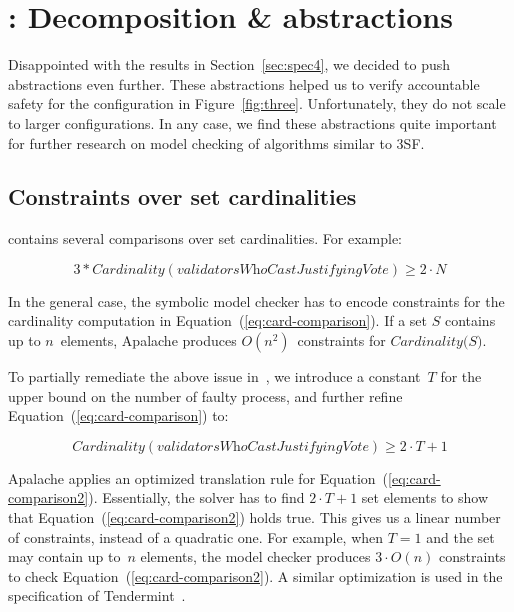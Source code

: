 
\section{\SpecFourB{}: Decomposition \& abstractions}\label{sec:spec4b}

Disappointed with the results in Section~\ref{sec:spec4}, we decided to
push abstractions even further. These abstractions helped us to verify
accountable safety for the configuration in Figure~\ref{fig:three}.
Unfortunately, they do not scale to larger configurations. In any case, we
find these abstractions quite important for further research on model checking
of algorithms similar to 3SF\@.


\subsection{Constraints over set cardinalities}

\SpecThree{} contains several comparisons over set cardinalities. For example:

\begin{equation}
    3 * \textit{Cardinality}(\textit{validatorsWhoCastJustifyingVote}) \ge 2 \cdot N
    \label{eq:card-comparison}
\end{equation}

In the general case, the symbolic model checker has to encode constraints for
the cardinality computation in Equation~(\ref{eq:card-comparison}). If a set
$S$ contains up to $n$~elements, Apalache produces $O(n^2)$~constraints for
$\textit{Cardinality(S)}$.

To partially remediate the above issue in~\SpecFour{}, we introduce a
constant~$T$ for the upper bound on the number of faulty process, and further
refine Equation~(\ref{eq:card-comparison}) to:

\begin{equation}
    \textit{Cardinality}(\textit{validatorsWhoCastJustifyingVote}) \ge 2 \cdot T + 1
    \label{eq:card-comparison2}
\end{equation}

Apalache applies an optimized translation rule for
Equation~(\ref{eq:card-comparison2}). Essentially, the solver has to find $2
\cdot T + 1$ set elements to show that Equation~(\ref{eq:card-comparison2})
holds true. This gives us a linear number of constraints, instead of a
quadratic one. For example, when $T=1$ and the set may contain up to~$n$
elements, the model checker produces $3 \cdot O(n)$ constraints to check
Equation~(\ref{eq:card-comparison2}). A similar optimization is used in the
specification of Tendermint~\cite{TendermintSpec2020}.

